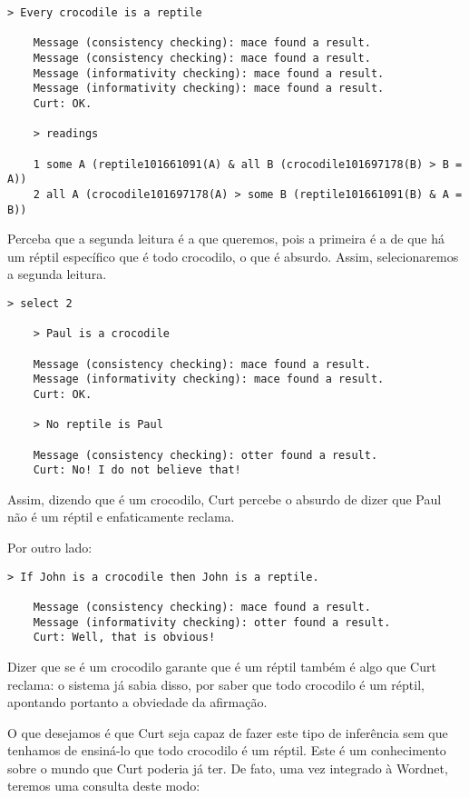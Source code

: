 	\begin{Verbatim}[fontseries=b,gobble=1]
	> Every crocodile is a reptile
	
	Message (consistency checking): mace found a result.
	Message (consistency checking): mace found a result.
	Message (informativity checking): mace found a result.
	Message (informativity checking): mace found a result.
	Curt: OK.
	
	> readings
	
	1 some A (reptile101661091(A) & all B (crocodile101697178(B) > B = A))
	2 all A (crocodile101697178(A) > some B (reptile101661091(B) & A = B))
	\end{Verbatim}
	
	Perceba que a segunda leitura é a que queremos, pois a primeira é a de que há um réptil específico que é todo crocodilo, o que é absurdo. Assim, selecionaremos a segunda leitura.
	
	\begin{Verbatim}[fontseries=b,gobble=1]
	> select 2
	
	> Paul is a crocodile
	
	Message (consistency checking): mace found a result.
	Message (informativity checking): mace found a result.
	Curt: OK.
	
	> No reptile is Paul
	
	Message (consistency checking): otter found a result.
	Curt: No! I do not believe that!
	\end{Verbatim}

	Assim, dizendo que  é um crocodilo, Curt percebe o absurdo de dizer que Paul não é um réptil e enfaticamente reclama.
	
	Por outro lado:
	
	\begin{Verbatim}[fontseries=b,gobble=1]
	> If John is a crocodile then John is a reptile.
	
	Message (consistency checking): mace found a result.
	Message (informativity checking): otter found a result.
	Curt: Well, that is obvious!
	\end{Verbatim}
	
	Dizer que se  é um crocodilo garante que  é um réptil também é algo que Curt reclama: o sistema já sabia disso, por saber que todo crocodilo é um réptil, apontando portanto a obviedade da afirmação.
	
	O que desejamos é que Curt seja capaz de fazer este tipo de inferência sem que tenhamos de ensiná-lo que todo crocodilo é um réptil. Este é um conhecimento sobre o mundo que Curt poderia já ter. De fato, uma vez integrado à Wordnet, teremos uma consulta deste modo:
	
